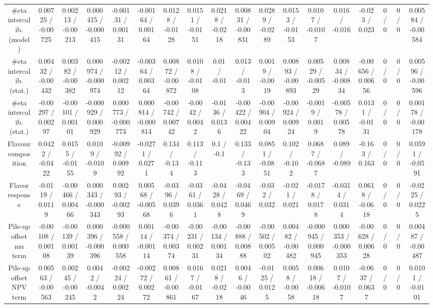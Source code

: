 \documentclass[10pt]{article}
\begin{document}
\begin{table}[htbp]
\begin{center}
\begin{tabular}{|c|c|c|c|c|c|c|c|c|c|c|c|c|c|c|c|c|c|}
  #eta intercalib. (model) & 0.00725 / -0.00725 & 0.00213 / -0.00213 & 0.000415 / -0.000415 & -0.00131 / 0.00131 & -0.00164 / 0.00164 & 0.0128 / -0.0128 & 0.0151 / -0.0151 & 0.0218 / -0.0218 & 0.00831 / -0.00831 & 0.0289 / -0.0289 & 0.0153 / -0.0153 & 0.0107 / -0.0107 & 0.016 / -0.016 & -0.023 / 0.023 & 0 / 0 & 0 / 0 & 0.00584 / -0.00584 \\ 
  #eta intercalib. (stat.) & 0.00432 / -0.00432 & 0.00382 / -0.00382 & 0.000974 / -0.000974 & -0.00212 / 0.00212 & -0.00364 / 0.00364 & 0.00872 / -0.00872 & 0.0108 / -0.0108 & 0.01 / -0.01 & 0.013 / -0.013 & 0.0019 / -0.0019 & 0.00893 / -0.00893 & 0.00529 / -0.00529 & 0.00834 / -0.00834 & -0.00656 / 0.00656 & 0 / 0 & 0 / 0 & 0.00596 / -0.00596 \\ 
  #eta intercalib. (stat.) & -0.00297 / 0.00297 & -0.00101 / 0.00101 & -0.000929 / 0.000929 & 0.000773 / -0.000773 & 0.000814 / -0.000814 & -0.00742 / 0.00742 & -0.0042 / 0.0042 & -0.0136 / 0.0136 & -0.00422 / 0.00422 & -0.00904 / 0.00904 & -0.00924 / 0.00924 & -0.0019 / 0.0019 & -0.00578 / 0.00578 & 0.0131 / -0.0131 & 0 / 0 & 0 / 0 & 0.00178 / -0.00178 \\ 
  Flavour composition & 0.0422 / -0.0422 & 0.0155 / -0.0155 & 0.0109 / -0.0109 & -0.00992 / 0.00992 & -0.0271 / 0.0271 & 0.134 / -0.134 & 0.113 / -0.113 & 0.1 / -0.1 & 0.133 / -0.133 & 0.0851 / -0.0851 & 0.102 / -0.102 & 0.0687 / -0.0687 & 0.089 / -0.089 & -0.163 / 0.163 & 0 / 0 & 0 / 0 & 0.0591 / -0.0591 \\ 
  Flavor response & -0.0119 / 0.0119 & -0.00466 / 0.00466 & 0.000343 / -0.000343 & 0.00293 / -0.00293 & 0.00568 / -0.00568 & -0.0396 / 0.0396 & -0.0361 / 0.0361 & -0.0428 / 0.0428 & -0.0469 / 0.0469 & -0.032 / 0.032 & -0.021 / 0.021 & -0.0178 / 0.0178 & -0.0314 / 0.0314 & 0.0618 / -0.0618 & 0 / 0 & 0 / 0 & -0.0225 / 0.0225 \\ 
  Pile-up offset mu term & -0.00108 / 0.00108 & -0.00139 / 0.00139 & 0.000396 / -0.000396 & -0.000558 / 0.000558 & 0.00114 / -0.00114 & -0.00374 / 0.00374 & -0.00231 / 0.00231 & -0.00134 / 0.00134 & -0.00888 / 0.00888 & -0.00502 / 0.00502 & 0.00482 / -0.00482 & -0.000945 / 0.000945 & 0.000353 / -0.000353 & -0.00628 / 0.00628 & 0 / 0 & 0 / 0 & 0.00487 / -0.00487 \\ 
  Pile-up offset NPV term & 0.00563 / -0.00563 & 0.00245 / -0.00245 & 0.0042 / -0.0042 & -0.00224 / 0.00224 & -0.00272 / 0.00272 & 0.00861 / -0.00861 & 0.0167 / -0.0167 & 0.0218 / -0.0218 & 0.0046 / -0.0046 & -0.0125 / 0.0125 & 0.0058 / -0.0058 & 0.00618 / -0.00618 & 0.0107 / -0.0107 & -0.0637 / 0.0637 & 0 / 0 & 0 / 0 & 0.0101 / -0.0101 \\ 

\end{tabular}
\end{center}
\end{table}
\end{document}
